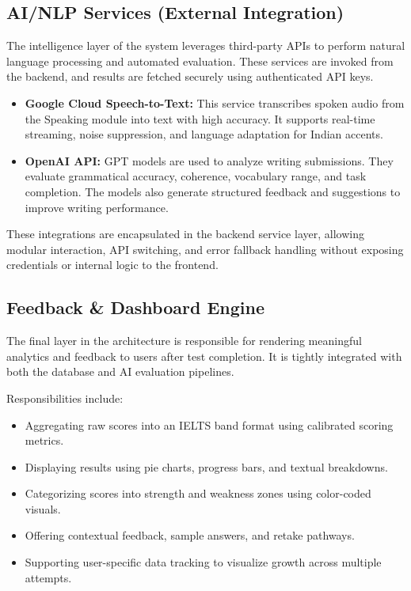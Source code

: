 \documentclass[a4paper,12pt]{article}
\begin{document}
\vspace{0.3cm}

\subsection{AI/NLP Services (External Integration)}

The intelligence layer of the system leverages third-party APIs to perform natural language processing and automated evaluation. These services are invoked from the backend, and results are fetched securely using authenticated API keys.

\begin{itemize}
    \item \textbf{Google Cloud Speech-to-Text:} This service transcribes spoken audio from the Speaking module into text with high accuracy. It supports real-time streaming, noise suppression, and language adaptation for Indian accents.
    
    \item \textbf{OpenAI API:} GPT models are used to analyze writing submissions. They evaluate grammatical accuracy, coherence, vocabulary range, and task completion. The models also generate structured feedback and suggestions to improve writing performance.
\end{itemize}

These integrations are encapsulated in the backend service layer, allowing modular interaction, API switching, and error fallback handling without exposing credentials or internal logic to the frontend.

\vspace{0.3cm}

\subsection{Feedback & Dashboard Engine}

The final layer in the architecture is responsible for rendering meaningful analytics and feedback to users after test completion. It is tightly integrated with both the database and AI evaluation pipelines.

Responsibilities include:

\begin{itemize}
    \item Aggregating raw scores into an IELTS band format using calibrated scoring metrics.
    \item Displaying results using pie charts, progress bars, and textual breakdowns.
    \item Categorizing scores into strength and weakness zones using color-coded visuals.
    \item Offering contextual feedback, sample answers, and retake pathways.
    \item Supporting user-specific data tracking to visualize growth across multiple attempts.
\end{itemize}
\end{document}
